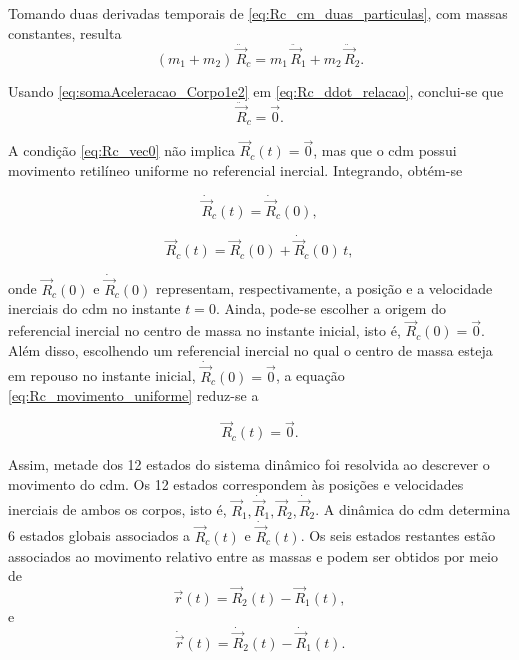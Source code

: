 Tomando duas derivadas temporais de \eqref{eq:Rc_cm_duas_particulas}, com massas constantes, resulta
\begin{equation}
(m_1+m_2)\,\ddot{\vec R}_c = m_1\,\ddot{\vec R}_1 + m_2\,\ddot{\vec R}_2.
\label{eq:Rc_ddot_relacao}
\end{equation}

Usando \eqref{eq:somaAceleracao_Corpo1e2} em \eqref{eq:Rc_ddot_relacao}, conclui-se que
\begin{equation}
    \label{eq:Rc_vec0}
\ddot{\vec R}_{c} = \vec 0.
\end{equation}


A condição \eqref{eq:Rc_vec0} não implica $\vec R_c(t)=\vec 0$, mas que o \gls{cdm} possui movimento retilíneo uniforme no referencial inercial. Integrando, obtém-se

\begin{equation}
\dot{\vec{R}}_c(t) = \dot{\vec{R}}_c(0),
\label{eq:Rc_dot_constante}
\end{equation}

\begin{equation}
\vec{R}_c(t) = \vec{R}_c(0) + \dot{\vec{R}}_c(0)\,t,
\label{eq:Rc_movimento_uniforme}
\end{equation}

onde $\vec{R}_{c}(0)$ e $\dot{\vec{R}}_{c}(0)$ representam, respectivamente, a posição e a velocidade inerciais do \gls{cdm} no instante $t = 0$.
Ainda, pode-se escolher a origem do referencial inercial no centro de massa no instante inicial, isto é, $\vec R_c(0)=\vec 0$.
Além disso, escolhendo um referencial inercial no qual o centro de massa esteja em repouso no instante inicial, $\dot{\vec R}_c(0)=\vec 0$, a equação \eqref{eq:Rc_movimento_uniforme} reduz-se a

\begin{equation}
\vec R_c(t)=\vec 0.
\label{eq:Rc_zero_por_escolha_referencial}
\end{equation}


Assim, metade dos 12 estados do sistema dinâmico foi resolvida ao descrever o movimento do \gls{cdm}.
Os 12 estados correspondem às posições e velocidades inerciais de ambos os corpos, isto é, $\vec R_1,\dot{\vec R}_1,\vec R_2,\dot{\vec R}_2$.
A dinâmica do \gls{cdm} determina 6 estados globais associados a $\vec R_c(t)$ e $\dot{\vec R}_c(t)$.
Os seis estados restantes estão associados ao movimento relativo entre as massas e podem ser obtidos por meio de
\begin{equation}
\vec r(t)=\vec R_2(t)-\vec R_1(t),
\label{eq:posicao_relativa}
\end{equation}
e
\begin{equation}
\dot{\vec r}(t)=\dot{\vec R}_2(t)-\dot{\vec R}_1(t).
\label{eq:velocidade_relativa}
\end{equation}

